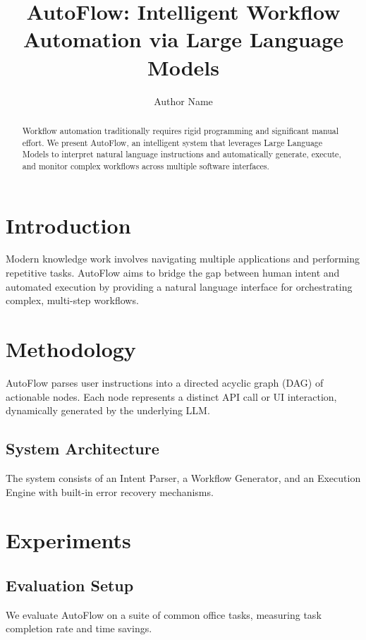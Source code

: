 \documentclass[sigconf]{acmart}
\begin{document}
\title{AutoFlow: Intelligent Workflow Automation via Large Language Models}

\author{Author Name}

\begin{abstract}
Workflow automation traditionally requires rigid programming and significant manual effort. We present AutoFlow, an intelligent system that leverages Large Language Models to interpret natural language instructions and automatically generate, execute, and monitor complex workflows across multiple software interfaces.
\end{abstract}


\maketitle

\section{Introduction}
Modern knowledge work involves navigating multiple applications and performing repetitive tasks. AutoFlow aims to bridge the gap between human intent and automated execution by providing a natural language interface for orchestrating complex, multi-step workflows.

\section{Methodology}
AutoFlow parses user instructions into a directed acyclic graph (DAG) of actionable nodes. Each node represents a distinct API call or UI interaction, dynamically generated by the underlying LLM.
\subsection{System Architecture}
The system consists of an Intent Parser, a Workflow Generator, and an Execution Engine with built-in error recovery mechanisms.

\section{Experiments}
\subsection{Evaluation Setup}
We evaluate AutoFlow on a suite of common office tasks, measuring task completion rate and time savings.
\end{document}
